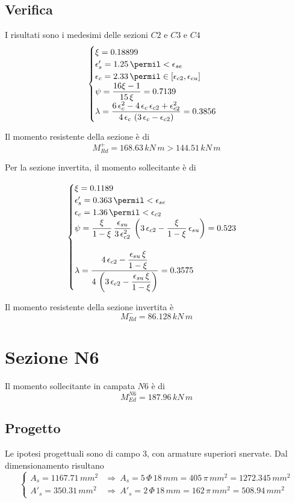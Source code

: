 \subsection{Verifica}
I risultati sono i medesimi delle sezioni $C2$ e $C3$ e $C4$
\[
\begin{cases}
	\xi = 0.18899\\
	\epsilon'_s = 1.25\,\permil < \epsilon_{se}\\
	\epsilon_c = 2.33\,\permil \in \left[\epsilon_{c2}, \epsilon_{cu}\right]\\
	\psi = \dfrac{16\xi -1}{15\,\xi} = 0.7139 \\
	\lambda = \dfrac{6\,\epsilon_{c}^2 - 4\,\epsilon_{c}\,\epsilon_{c2} + \epsilon_{c2}^2}{4\,\epsilon_{c}\,\left(3\,\epsilon_c - \epsilon_{c2}\right)} = 0.3856
\end{cases}
\]

Il momento resistente della sezione è di
\[
M_{Rd}^+ = 168.63\,kN\,m > 144.51\,kN\,m
\]

Per la sezione invertita, il momento sollecitante è di 

\[
\begin{cases}
	\xi = 0.1189\\
	\epsilon'_s = 0.363\,\permil<\epsilon_{se}\\
	\epsilon_c = 1.36\,\permil < \epsilon_{c2}\\
	\psi = \dfrac{\xi}{1-\xi}\,\dfrac{\epsilon_{su}}{3\,\epsilon_{c2}^2}\,\left(3\,\epsilon_{c2} - \dfrac{\xi}{1-\xi}\,\epsilon_{su}\right) = 0.523\\\\
	\lambda = \dfrac{4\,\epsilon_{c2} - \dfrac{\epsilon_{su}\,\xi}{1-\xi}}{4\,\left(3\,\epsilon_{c2} - \dfrac{\epsilon_{su}\,\xi}{1-\xi}\right)} = 0.3575
\end{cases}
\]

Il momento resistente della sezione invertita è
\[
M_{Rd}^- = 86.128\,kN\,m
\]

\section{Sezione N6}
Il momento sollecitante in campata $N6$ è di 
\[
M_{Ed}^{N6} = 187.96\,kN\,m
\]
\subsection{Progetto}
Le ipotesi progettuali sono di campo 3, con armature superiori snervate. Dal dimensionamento risultano
\[
\begin{cases}
	A_s = 1167.71\,mm^2 &\Longrightarrow~A_s = 5\,\Phi\,18\,mm = 405\,\pi\,mm^2 = 1272.345\,mm^2\\
	A'_s = 350.31\,mm^2 &\Longrightarrow~ A'_s = 2\,\Phi\,18\,mm = 162\,\pi\,mm^2 = 508.94\,mm^2
\end{cases}
\]

